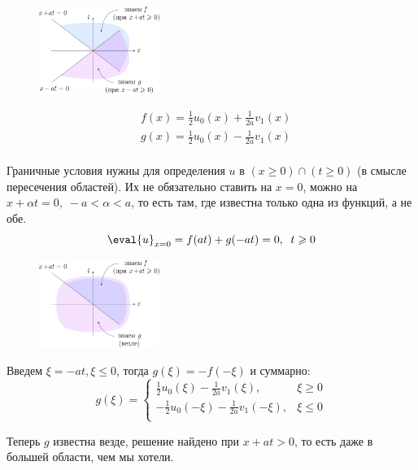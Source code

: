 \documentclass[../main.tex]{subfiles}
\begin{document}
\begin{figure}
    \centering
    \includegraphics[width=0.35\textwidth]{./pic 4_1.pdf}
\end{figure}

\begin{align*}
    & f(x) = \frac{1}{2}u_0(x) + \frac{1}{2a}v_1(x) \\
    & g(x) = \frac{1}{2}u_0(x) - \frac{1}{2a}v_1(x) \\
\end{align*}

Граничные условия нужны для определения $u$ в $(x \geq 0)\cap(t \geq 0)$ (в смысле пересечения областей). Их не обязательно ставить на $x=0$, можно на $x + \alpha t = 0, \; -a < \alpha < a$, то есть там, где известна только одна из функций, а не обе.
$$
\eval{u}_{x=0} = f(at) + g(-at)=0, \;\; t \geq 0
$$
\clearpage %

\begin{figure}
    \includegraphics[width=0.35\textwidth]{./pic 4_2.pdf}
\end{figure}

Введем $\xi = -at, \xi \leq 0$, тогда $g(\xi) = -f(-\xi)$ и суммарно:
\begin{equation*}
    g(\xi) = \begin{cases}
        \frac{1}{2}u_0(\xi)-\frac{1}{2a}v_1(\xi), & \xi \geq 0\\
        -\frac{1}{2}u_0(-\xi)-\frac{1}{2a}v_1(-\xi), & \xi \leq 0\\
    \end{cases}
\end{equation*}

Теперь $g$ известна везде, решение найдено при $x + at > 0$, то есть даже в большей области, чем мы хотели.
\end{document}
